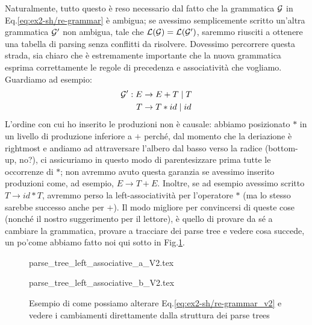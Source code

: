 \documentclass[class=book, crop=false, oneside, 12pt]{standalone}
\begin{document}
Naturalmente, tutto questo è reso necessario dal fatto che la grammatica \(\mathcal{G}\) in Eq.\ref{eq:ex2-sh/re-grammar} è ambigua; se avessimo semplicemente scritto un'altra grammatica \(\mathcal{G}'\) non ambigua, tale che \(\mathcal{L}(\mathcal{G}) = \mathcal{L}(\mathcal{G}')\), saremmo riusciti a ottenere una tabella di parsing senza conflitti da risolvere. Dovessimo percorrere questa strada, sia chiaro che è estremamente importante che la nuova grammatica esprima correttamente le regole di precedenza e associatività che vogliamo. Guardiamo ad esempio:
\begin{align}
    \label{eq:ex2-sh/re-grammar_v2}
    \mathcal{G}': E &\to E + T \mid T \\
    T &\to T * id \mid id \notag
\end{align}
L'ordine con cui ho inserito le produzioni non è causale: abbiamo posizionato \(*\) in un livello di produzione inferiore a \(+\) perché, dal momento che la deriazione è rightmost e andiamo ad attraversare l'albero dal basso verso la radice (bottom-up, no?), ci assicuriamo in questo modo di parentesizzare prima tutte le occorrenze di \(\ast\); non avremmo avuto questa garanzia se avessimo inserito produzioni come, ad esempio, \(E \to T + E\). Inoltre, se ad esempio avessimo scritto \(T \to id * T\), avremmo perso la left-associatività per l'operatore \(\ast\) (ma lo stesso sarebbe successo anche per \(+\)). Il modo migliore per convincersi di queste cose (nonché il nostro suggerimento per il lettore), è quello di provare da sé a cambiare la grammatica, provare a tracciare dei parse tree e vedere cosa succede, un po'come abbiamo fatto noi qui sotto in Fig.\ref{fig:ex2-sh_re-altgrm-ptree}.
\begin{figure}[H]
    \begin{minipage}[b]{.4\textwidth}
        \centering
        {parse_tree_left_associative_a_V2.tex}
        \label{fig:ex2-sh_re-altgrm-ptree_1}
    \end{minipage}
    \hfill
    \begin{minipage}[b]{.4\textwidth}
        \centering
        {parse_tree_left_associative_b_V2.tex}
        \label{fig:ex2-sh_re-altgrm-ptree_2}
    \end{minipage}
    \caption{Esempio di come possiamo alterare Eq.\ref{eq:ex2-sh/re-grammar_v2} e vedere i cambiamenti direttamente dalla struttura dei parse trees}
    \label{fig:ex2-sh_re-altgrm-ptree}
\end{figure}
\end{document}
